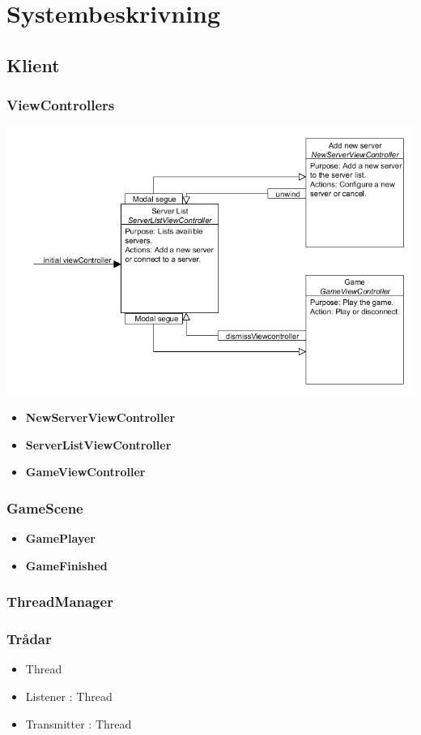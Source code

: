 \documentclass[10pt, titlepage, oneside, a4paper]{article}
\begin{document}
    \newpage
    \section{Systembeskrivning}
    	\subsection{Klient}
    		\subsubsection{ViewControllers}
    		\includegraphics[scale=.4]{./png/StoryBoard.png}
    		\begin{itemize}
    			\item\textbf{NewServerViewController}
    			\item\textbf{ServerListViewController}
    			\item\textbf{GameViewController}
    		\end{itemize}
    		\subsubsection{GameScene}
    		\begin{itemize}
    			\item\textbf{GamePlayer}
    			\item\textbf{GameFinished}
    		\end{itemize}
    		\subsubsection{ThreadManager}
    		\subsubsection{Trådar}
    		\begin{itemize}
    			\item Thread
    			\item Listener : Thread
    			\item Transmitter : Thread
    		\end{itemize}
\end{document}
